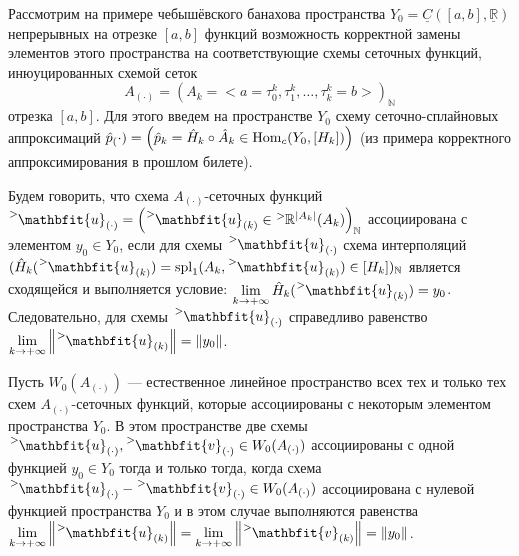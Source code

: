 
Рассмотрим на примере чебышёвского банахова пространства $Y_0 = \underline{C}([a, b], \underline{\mathbb{R}})$ непрерывных на отрезке $[a, b]$ функций возможность корректной замены элементов этого пространства на соответствующие схемы сеточных функций, инюуцированных схемой сеток $$A_{(\cdot)} = \left(A_k = \big<a = \tau_0^k, \tau_1^k, \dotsc, \tau_k^k = b\big>\right)_{\mathbb{N}}$$ отрезка $[a, b]$. Для этого введем на пространстве $Y_0$ схему сеточно-сплайновых аппроксимаций $\hat{p}_(\cdot) = \left(\hat{p}_k = \hat{H}_k \circ \hat{A}_k \in \mathrm{Hom}_c(Y_0, [H_k])\right)$  (из примера корректного аппроксимирования в прошлом билете). 

Будем говорить, что схема $A_{(\cdot)}$-сеточных функций $\tensor[^{>}]{\mathbfit{u}}{_{(\cdot)}} = \left(\tensor[^{>}]{\mathbfit{u}}{_{(k)}} \in \tensor[^{>}]{\mathbb{R}}{^{\abs{A_k}}}(A_k)\right)_{\mathbb{N}}$ ассоциирована с элементом $y_0 \in Y_0$, если для схемы $\tensor[^{>}]{\mathbfit{u}}{_{(\cdot)}}$ схема интерполяций $(\hat{H}_k(\tensor[^{>}]{\mathbfit{u}}{_{(k)}}) = \spl_1(A_k, \tensor[^{>}]{\mathbfit{u}}{_{(k)}}) \in [H_k])_{\mathbb{N}}$ является сходящейся и выполняется условие: $\lim\limits_{k \to +\infty}{\hat{H}_k(\tensor[^{>}]{\mathbfit{u}}{_{(k)}})} = y_0$. Следовательно, для схемы $\tensor[^{>}]{\mathbfit{u}}{_{(\cdot)}}$ справедливо равенство $\lim\limits_{k \to +\infty}{\norm{\tensor[^{>}]{\mathbfit{u}}{_{(k)}}}} = \norm{y_0}$.

Пусть $W_0(A_{(\cdot)})$ --- естественное линейное пространство всех тех и только тех схем $A_{(\cdot)}$-сеточных функций, которые ассоциированы с некоторым элементом пространства $Y_0$. В этом пространстве две схемы $\tensor[^{>}]{\mathbfit{u}}{_{(\cdot)}}, \tensor[^{>}]{\mathbfit{v}}{_{(\cdot)}} \in W_0(A_{(\cdot)})$ ассоциированы с одной функцией $y_0 \in Y_0$ тогда и только тогда, когда схема $\tensor[^{>}]{\mathbfit{u}}{_{(\cdot)}} - \tensor[^{>}]{\mathbfit{v}}{_{(\cdot)}} \in W_0(A_{(\cdot)})$ ассоциирована с нулевой функцией пространства $Y_0$ и в этом случае выполняются равенства $\lim\limits_{k \to +\infty}{\norm{\tensor[^{>}]{\mathbfit{u}}{_{(k)}}}} = \lim\limits_{k \to +\infty}{\norm{\tensor[^{>}]{\mathbfit{v}}{_{(k)}}}} = \norm{y_0}$. 

